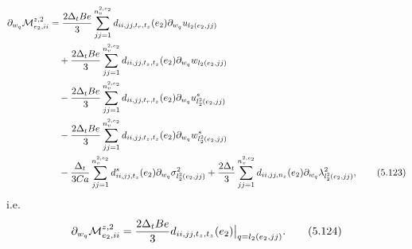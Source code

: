 \documentclass{article}
\begin{document}
\begin{align}
\partial_{w_q}\mathcal{M}_{e_2,ii}^{z,2} &= \frac{2\Delta_t Be}{3} \sum_{jj=1}^{n_v^{2,e_2}} d_{ii,jj,t_r,t_z}(e_2) \partial_{w_q} u_{l_2(e_2,jj)} \nonumber\\
&\quad + \frac{2\Delta_t Be}{3} \sum_{jj=1}^{n_v^{2,e_2}} d_{ii,jj,t_z,t_z}(e_2) \partial_{w_q} w_{l_2(e_2,jj)} \nonumber\\
&\quad - \frac{2\Delta_t Be}{3} \sum_{jj=1}^{n_v^{2,e_2}} d_{ii,jj,t_r,t_z}(e_2) \partial_{w_q} u_{l_2^2(e_2,jj)}^s \nonumber\\
&\quad - \frac{2\Delta_t Be}{3} \sum_{jj=1}^{n_v^{2,e_2}} d_{ii,jj,t_z,t_z}(e_2) \partial_{w_q} w_{l_2^2(e_2,jj)}^s \nonumber\\
&\quad - \frac{\Delta_t}{3Ca} \sum_{jj=1}^{n_v^{2,e_2}} d_{ii,jj,t_z}^s(e_2) \partial_{w_q} \sigma_{l_2^2(e_2,jj)}^2 + \frac{2\Delta_t}{3} \sum_{jj=1}^{n_v^{2,e_2}} d_{ii,jj,n_z}(e_2) \partial_{w_q} \lambda_{l_2^2(e_2,jj)}^2, \tag{5.123}
\end{align}
i.e.
\begin{equation}
\partial_{w_q}\mathcal{M}_{e_2,ii}^{z,2} = \frac{2\Delta_t Be}{3} d_{ii,jj,t_z,t_z}(e_2) \big|_{q=l_2(e_2,jj)}. \tag{5.124}
\end{equation}
\end{document}

